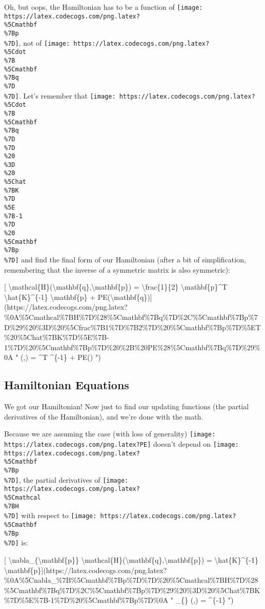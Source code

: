\documentclass[]{article}
\begin{document}
Oh, but oops, the Hamiltonian has to be a function of
\texttt{[image: https://latex.codecogs.com/png.latex?\\\%5Cmathbf\\\%7Bp\\\%7D]}, not
of
\texttt{[image: https://latex.codecogs.com/png.latex?\\\%5Cdot\\\%7B\\\%5Cmathbf\\\%7Bq\\\%7D\\\%7D]}.
Let's remember that
\texttt{[image: https://latex.codecogs.com/png.latex?\\\%5Cdot\\\%7B\\\%5Cmathbf\\\%7Bq\\\%7D\\\%7D\\\%20\\\%3D\\\%20\\\%5Chat\\\%7BK\\\%7D\\\%5E\\\%7B-1\\\%7D\\\%20\\\%5Cmathbf\\\%7Bp\\\%7D]}
and find the final form of our Hamiltonian (after a bit of simplification,
remembering that the inverse of a symmetric matrix is also symmetric):

{[}
\textbackslash{}mathcal\{H\}(\textbackslash{}mathbf\{q\},\textbackslash{}mathbf\{p\})
= \textbackslash{}frac\{1\}\{2\} \textbackslash{}mathbf\{p\}\^{}T
\textbackslash{}hat\{K\}\^{}\{-1\} \textbackslash{}mathbf\{p\} +
PE(\textbackslash{}mathbf\{q\}){]}(https://latex.codecogs.com/png.latex?\%0A\%5Cmathcal\%7BH\%7D\%28\%5Cmathbf\%7Bq\%7D\%2C\%5Cmathbf\%7Bp\%7D\%29\%20\%3D\%20\%5Cfrac\%7B1\%7D\%7B2\%7D\%20\%5Cmathbf\%7Bp\%7D\%5ET\%20\%5Chat\%7BK\%7D\%5E\%7B-1\%7D\%20\%5Cmathbf\%7Bp\%7D\%20\%2B\%20PE\%28\%5Cmathbf\%7Bq\%7D\%29\%0A
" (,) =  \^{}T
\^{}\{-1\}  + PE() ")

\hypertarget{hamiltonian-equations}{%
\subsection{Hamiltonian Equations}\label{hamiltonian-equations}}

We got our Hamiltonian! Now just to find our updating functions (the partial
derivatives of the Hamiltonian), and we're done with the math.

Because we are assuming the case (with loss of generality)
\texttt{[image: https://latex.codecogs.com/png.latex?PE]} doesn't depend on
\texttt{[image: https://latex.codecogs.com/png.latex?\\\%5Cmathbf\\\%7Bp\\\%7D]}, the
partial derivatives of
\texttt{[image: https://latex.codecogs.com/png.latex?\\\%5Cmathcal\\\%7BH\\\%7D]} with
respect to
\texttt{[image: https://latex.codecogs.com/png.latex?\\\%5Cmathbf\\\%7Bp\\\%7D]} is:

{[} \textbackslash{}nabla\_\{\textbackslash{}mathbf\{p\}\}
\textbackslash{}mathcal\{H\}(\textbackslash{}mathbf\{q\},\textbackslash{}mathbf\{p\})
= \textbackslash{}hat\{K\}\^{}\{-1\}
\textbackslash{}mathbf\{p\}{]}(https://latex.codecogs.com/png.latex?\%0A\%5Cnabla\_\%7B\%5Cmathbf\%7Bp\%7D\%7D\%20\%5Cmathcal\%7BH\%7D\%28\%5Cmathbf\%7Bq\%7D\%2C\%5Cmathbf\%7Bp\%7D\%29\%20\%3D\%20\%5Chat\%7BK\%7D\%5E\%7B-1\%7D\%20\%5Cmathbf\%7Bp\%7D\%0A
" \nabla\_\{\} (,) = \^{}\{-1\}
 ")
\end{document}
